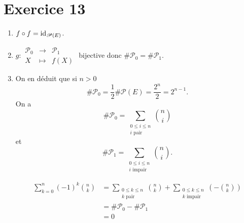 \part{Exercice 13}

\begin{enumerate}
	\item $f \circ f = \operatorname{id}_{\mathcal{P}(E)}$.
	\item $g : \begin{array}{rcl}
			\mathcal{P}_0 &\longrightarrow& \mathcal{P}_1 \\
			X &\longmapsto& f(X)
		\end{array}$ bijective donc $\#\mathcal{P}_0 = \#\mathcal{P}_1$.
	\item On en déduit que si $n > 0$ \[
			\#\mathcal{P}_0 = \frac{1}{2} \#\mathcal{P}(E) = \frac{2^n}{2} = 2^{n-1}.
		\]
		On a \[
			\#\mathcal{P}_0 = \sum_{\substack{0 \le i \le n \\ i \text{ pair}}} {n \choose i}
		\] et \[
			\#\mathcal{P}_1 = \sum_{\substack{0 \le i \le n \\ i \text{ impair}}} {n \choose i}.
		\]

		\begin{align*}
			\sum_{k=0}^n (-1)^k{n\choose k} &= \sum_{\substack{0 \le k \le n\\ k \text{ pair}}} {n \choose k} + \sum_{\substack{0 \le k \le n\\ k \text{ impair}}} \left( - {n \choose k} \right)  \\
			&= \#\mathcal{P}_0 - \#\mathcal{P}_1 \\
			&= 0 \\
		\end{align*}
\end{enumerate}
